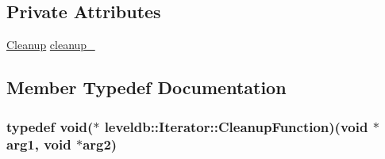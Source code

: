 \subsection*{Private Attributes}
\begin{DoxyCompactItemize}
\item 
\hyperlink{structleveldb_1_1_iterator_1_1_cleanup}{Cleanup} \hyperlink{classleveldb_1_1_iterator_aa65451661a270eab5db682d4e4a01773}{cleanup\-\_\-}
\end{DoxyCompactItemize}


\subsection{Member Typedef Documentation}
\hypertarget{classleveldb_1_1_iterator_a3bb875a5d70208c14bcbd785c24e334f}{
\subsubsection[{Cleanup\-Function}]{\setlength{\rightskip}{0pt plus 5cm}typedef void($\ast$ leveldb\-::\-Iterator\-::\-Cleanup\-Function)(void $\ast$arg1, void $\ast$arg2)}}\label{classleveldb_1_1_iterator_a3bb875a5d70208c14bcbd785c24e334f}


